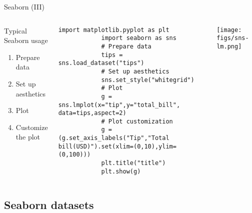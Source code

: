 \documentclass[10pt,compress]{beamer} %
\begin{document}
\begin{frame}[fragile]{Seaborn (III)}
	\begin{columns}
		\begin{block}{Typical Seaborn usage}
		\begin{enumerate}
			\item Prepare data
			\item Set up aesthetics
			\item Plot
			\item Customize the plot
		\end{enumerate}
	\end{block}


		\begin{exampleblock}{}
			\vspace{-0.2cm} 
			\begin{lstlisting}[basicstyle=\tiny]
			import matplotlib.pyplot as plt
			import seaborn as sns
			# Prepare data
			tips = sns.load_dataset("tips")
			# Set up aesthetics
			sns.set_style("whitegrid")
			# Plot
			g = sns.lmplot(x="tip",y="total_bill", data=tips,aspect=2)
			# Plot customization
			g = (g.set_axis_labels("Tip","Total bill(USD)").set(xlim=(0,10),ylim=(0,100)))
			plt.title("title")
			plt.show(g)
			\end{lstlisting}
			\vspace{-0.2cm} 
		\end{exampleblock}

		\texttt{[image: figs/sns-lm.png]}\\
	\end{columns}
\end{frame}

\subsection{Seaborn datasets}
\end{document}
